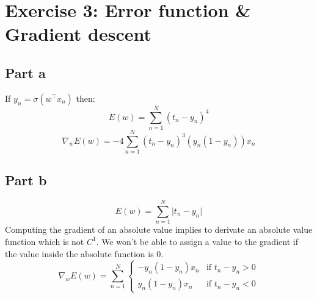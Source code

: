 \documentclass[a4paper, 10pt]{article}
\begin{document}
\section{Exercise 3: Error function \& Gradient descent}
\subsection{Part a}
If $y_n = \sigma(w^\top x_n)$ then:
$$
E(w) = \sum_{n=1}^N (t_n-y_n)^4
$$
$$
\nabla_w E(w) = -4\sum_{n=1}^N (t_n-y_n)^3(y_n (1-y_n))x_n
$$

\subsection{Part b}
$$
E(w) = \sum_{n=1}^N \vert t_n - y_n \vert
$$
Computing the gradient of an absolute value implies to derivate an
absolute value function which  is not $C^1$. We won't be able to assign 
a value to the gradient if the value inside the absolute function is 0.
$$
\nabla_w E(w) = \sum_{n=1}^N \left\{ \begin{array}{ll}  
                    -y_n(1-y_n)x_n & \text{if $t_n-y_n > 0$}
                \\ 
                    y_n(1-y_n)x_n & \text{if $t_n-y_n < 0$}
                        \end{array}
                \right.
$$
\end{document}

